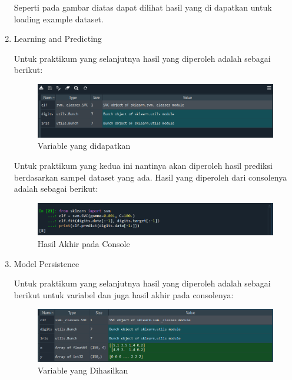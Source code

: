 \documentclass{report}
\begin{document}
\begin{enumerate}
   	\hangindent=0.5cm Seperti pada gambar diatas dapat dilihat hasil yang di dapatkan untuk loading example dataset.
   	
   \item Learning and Predicting 
   
   	\hangindent=0.5cm Untuk praktikum yang selanjutnya hasil yang diperoleh adalah sebagai berikut:
   	
   	\begin{figure}[hbtp]
   	\caption{Variable yang didapatkan}
   	\centering
   	\includegraphics[scale=0.7]{../figures/Praktikum 3.png}
   	\end{figure}
   	
   	\hangindent=0.5cm Untuk praktikum yang kedua ini nantinya akan diperoleh hasil prediksi berdasarkan sampel dataset yang ada. Hasil yang diperoleh dari consolenya adalah sebagai berikut:
   	
   	\begin{figure}[hbtp]
   	\caption{Hasil Akhir pada Console}
   	\centering
   	\includegraphics[scale=0.7]{../figures/Praktikum 4.png}
   	\end{figure}
   	
   \item Model Persistence
   
   	\hangindent=0.5cm Untuk praktikum yang selanjutnya hasil yang diperoleh adalah sebagai berikut untuk variabel dan juga hasil akhir pada consolenya:
   	
   	\begin{figure}[hbtp]
   	\caption{Variable yang Dihasilkan}
   	\centering
   	\includegraphics[scale=0.5]{../figures/Praktikum 5.png}
   	\end{figure}
   	

\end{enumerate}
\end{document}
